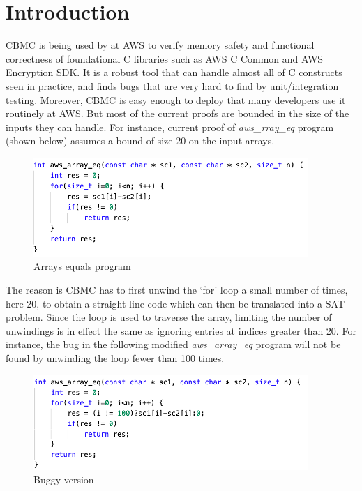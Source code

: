 \section{Introduction}


CBMC is being used by at AWS to verify memory safety and functional
correctness of foundational C libraries such as AWS C Common and AWS
Encryption SDK. It is a robust tool that can handle almost all of C
constructs seen in practice, and finds bugs that are very hard to find
by unit/integration testing. Moreover, CBMC is easy enough to deploy
that many developers use it routinely at AWS. But most of the current
proofs are bounded in the size of the inputs they can handle. For
instance, current proof of \emph{aws\_rray\_eq} program (shown below)
assumes a bound of size 20 on the input arrays.

\begin{figure}[H]
  \centering
  \includegraphics[scale=0.6]{Picture1.png}
  \caption{Arrays equals program}
\end{figure}

The reason is CBMC has to first unwind the ‘for’ loop a small number
of times, here 20, to obtain a straight-line code which can then be
translated into a SAT problem. Since the loop is used to traverse the
array, limiting the number of unwindings is in effect the same as
ignoring entries at indices greater than 20. For instance, the bug in
the following modified \emph{aws\_array\_eq} program will not be found by
unwinding the loop fewer than 100 times.

\begin{figure}[H]
  \centering
  \includegraphics[scale=0.6]{Picture2.png}
  \caption{Buggy version}
\end{figure}

